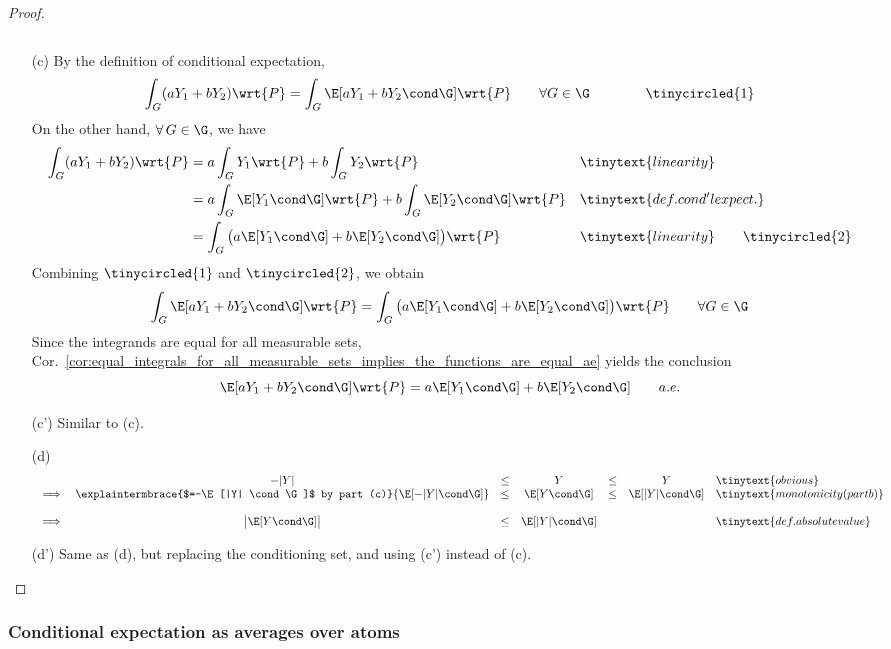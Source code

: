 \documentclass{article} %
\begin{document}
\begin{proof}
\begin{itemize}
\[\]
\item[(c)] 
By the definition 
of conditional expectation,
%
\[ \int_G (a Y_1 + b Y_2 ) \wrt{P} = \int_G \E[a Y_1 + b Y_2 \cond \G ]\wrt{P} \quad \quad \forall G \in \G \quad \quad \quad \quad \tinycircled{1} \]
On the other hand, $\forall \, G \in \G$, we have 
\begin{align*}
\int_G (a Y_1 + b Y_2 ) \wrt{P} &= a \int_G Y_1 \wrt{P} + b \int_G Y_2  \wrt{P}  && \tinytext{linearity} \\
&= a \int_G \E[Y_1 \cond \G] \wrt{P} + b \int_G \E[Y_2 \cond \G]  \wrt{P}  && \tinytext{def. cond'l expect.} \\
&= \int_G  \big( a\E[Y_1 \cond \G]  + b \E[Y_2 \cond \G]  \big) \wrt{P}  && \tinytext{linearity} \quad \quad \tinycircled{2} \\  
\end{align*}
Combining $\tinycircled{1}$ and $\tinycircled{2}$, we obtain
\[ \int_G \E[a Y_1 + b Y_2 \cond \G ]\wrt{P}  = \int_G  \big( a\E[Y_1 \cond \G]  + b \E[Y_2 \cond \G]  \big) \wrt{P} \quad \quad \forall G \in \G  \] 
Since the integrands are equal for all measurable sets,  Cor.~\ref{cor:equal_integrals_for_all_measurable_sets_implies_the_functions_are_equal_ae} yields the conclusion
\[ \E[a Y_1 + b Y_2 \cond \G ]\wrt{P}  =  a\E[Y_1 \cond \G]  + b \E[Y_2 \cond \G]   \quad \quad a.e.  \]
\item[(c')] Similar to (c).
\item[(d)]\footnotemark
\[\begin{array}{rcccccl}
& -|Y| &\leq & Y &\leq & Y &\tinytext{obvious} \\
\implies & \explaintermbrace{$=-\E[|Y| \cond \G]$ by part (c)}{\E[-|Y| \cond \G]} &\leq & \E[Y \cond \G]  &\leq & \E[|Y| \cond \G]  &\tinytext{monotonicity (part b)} \\
&&&&&&\\
 \implies & \big| \E[Y \cond \G] \big| &\leq & \E[|Y| \cond \G] & & & \tinytext{def. absolute value}
\end{array}\]
\item[(d')] Same as (d), but replacing the conditioning set, and using (c') instead of (c).
\end{itemize}
\end{proof}

\subsubsection{Conditional expectation as averages over atoms}
\end{document}
